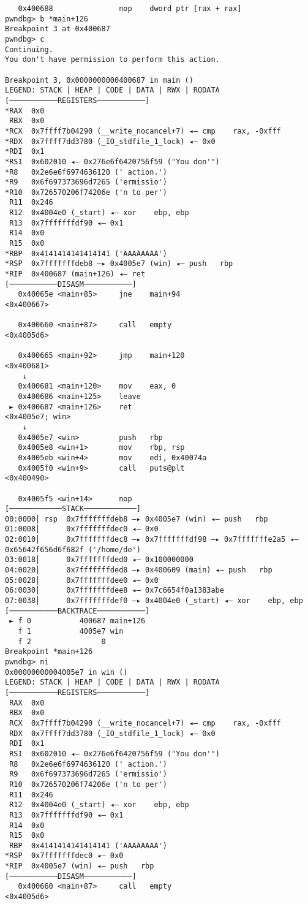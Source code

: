 \documentclass{article}
\begin{document}
\begin{lstlisting}
   0x400688               nop    dword ptr [rax + rax]
pwndbg> b *main+126
Breakpoint 3 at 0x400687
pwndbg> c
Continuing.
You don't have permission to perform this action.

Breakpoint 3, 0x0000000000400687 in main ()
LEGEND: STACK | HEAP | CODE | DATA | RWX | RODATA
[───────────REGISTERS───────────]
*RAX  0x0
 RBX  0x0
*RCX  0x7ffff7b04290 (__write_nocancel+7) ◂— cmp    rax, -0xfff
*RDX  0x7ffff7dd3780 (_IO_stdfile_1_lock) ◂— 0x0
*RDI  0x1
*RSI  0x602010 ◂— 0x276e6f6420756f59 ("You don'")
*R8   0x2e6e6f6974636120 (' action.')
*R9   0x6f697373696d7265 ('ermissio')
*R10  0x726570206f74206e ('n to per')
 R11  0x246
 R12  0x4004e0 (_start) ◂— xor    ebp, ebp
 R13  0x7fffffffdf90 ◂— 0x1
 R14  0x0
 R15  0x0
*RBP  0x4141414141414141 ('AAAAAAAA')
*RSP  0x7fffffffdeb8 —▸ 0x4005e7 (win) ◂— push   rbp
*RIP  0x400687 (main+126) ◂— ret    
[───────────DISASM───────────]
   0x40065e <main+85>     jne    main+94                       <0x400667>
 
   0x400660 <main+87>     call   empty                         <0x4005d6>
 
   0x400665 <main+92>     jmp    main+120                      <0x400681>
    ↓
   0x400681 <main+120>    mov    eax, 0
   0x400686 <main+125>    leave  
 ► 0x400687 <main+126>    ret                                  <0x4005e7; win>
    ↓
   0x4005e7 <win>         push   rbp
   0x4005e8 <win+1>       mov    rbp, rsp
   0x4005eb <win+4>       mov    edi, 0x40074a
   0x4005f0 <win+9>       call   puts@plt                      <0x400490>
 
   0x4005f5 <win+14>      nop    
[────────────STACK────────────]
00:0000│ rsp  0x7fffffffdeb8 —▸ 0x4005e7 (win) ◂— push   rbp
01:0008│      0x7fffffffdec0 ◂— 0x0
02:0010│      0x7fffffffdec8 —▸ 0x7fffffffdf98 —▸ 0x7fffffffe2a5 ◂— 0x65642f656d6f682f ('/home/de')
03:0018│      0x7fffffffded0 ◂— 0x100000000
04:0020│      0x7fffffffded8 —▸ 0x400609 (main) ◂— push   rbp
05:0028│      0x7fffffffdee0 ◂— 0x0
06:0030│      0x7fffffffdee8 ◂— 0x7c6654f0a1383abe
07:0038│      0x7fffffffdef0 —▸ 0x4004e0 (_start) ◂— xor    ebp, ebp
[───────────BACKTRACE───────────]
 ► f 0           400687 main+126
   f 1           4005e7 win
   f 2                0
Breakpoint *main+126
pwndbg> ni
0x00000000004005e7 in win ()
LEGEND: STACK | HEAP | CODE | DATA | RWX | RODATA
[───────────REGISTERS───────────]
 RAX  0x0
 RBX  0x0
 RCX  0x7ffff7b04290 (__write_nocancel+7) ◂— cmp    rax, -0xfff
 RDX  0x7ffff7dd3780 (_IO_stdfile_1_lock) ◂— 0x0
 RDI  0x1
 RSI  0x602010 ◂— 0x276e6f6420756f59 ("You don'")
 R8   0x2e6e6f6974636120 (' action.')
 R9   0x6f697373696d7265 ('ermissio')
 R10  0x726570206f74206e ('n to per')
 R11  0x246
 R12  0x4004e0 (_start) ◂— xor    ebp, ebp
 R13  0x7fffffffdf90 ◂— 0x1
 R14  0x0
 R15  0x0
 RBP  0x4141414141414141 ('AAAAAAAA')
*RSP  0x7fffffffdec0 ◂— 0x0
*RIP  0x4005e7 (win) ◂— push   rbp
[───────────DISASM───────────]
   0x400660 <main+87>     call   empty                         <0x4005d6>
 

\end{lstlisting}
\end{document}
